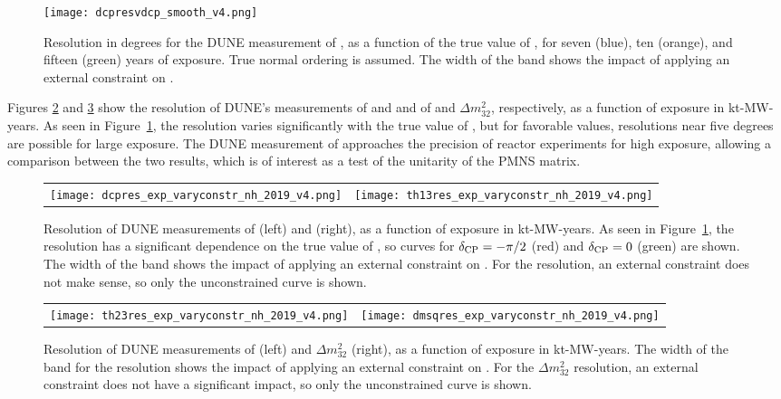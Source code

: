 \begin{figure}[h!]
    \centering
		\texttt{[image: dcpresvdcp\_smooth\_v4.png]}
	\caption[Resolution for the DUNE measurement of \deltacp as a function of \deltacp]
	{Resolution in degrees for the DUNE measurement of \deltacp, as a function of the true value of \deltacp, for seven (blue), ten (orange), and fifteen (green) years of exposure. True normal ordering is assumed. The width of the band shows the impact of applying an external constraint on .}
    \label{fig:dcpresvdcp}
\end{figure}

Figures \ref{fig:appres_exp} and  \ref{fig:disres_exp} show the resolution of DUNE's measurements of \deltacp and  and of  and $\Delta m^{2}_{32}$, respectively, as a function of exposure in kt-MW-years. As seen in Figure~\ref{fig:dcpresvdcp}, the \deltacp resolution varies significantly with the true value of \deltacp, but for favorable values, resolutions near five degrees are possible for large exposure. The DUNE measurement of  approaches the precision of reactor experiments for high exposure, allowing a comparison between the two results, which is of interest as a test of the unitarity of the PMNS matrix. 

\begin{figure}[h!]
    \centering
    \begin{tabular}{cc}
		\texttt{[image: dcpres\_exp\_varyconstr\_nh\_2019\_v4.png]} &
		\texttt{[image: th13res\_exp\_varyconstr\_nh\_2019\_v4.png]} 
	\end{tabular}  
	\caption[Resolution of DUNE measurements of \deltacp and , as a function of exposure]{Resolution of DUNE measurements of \deltacp (left) and  (right), as a function of exposure in kt-MW-years. As seen in Figure~\ref{fig:dcpresvdcp}, the \deltacp resolution has a significant dependence on the true value of \deltacp, so curves for $\delta_{\rm CP}=-\pi/2$ (red) and $\delta_{\rm CP}=0$ (green) are shown. The width of the band shows the impact of applying an external constraint on . For the  resolution, an external constraint does not make sense, so only the unconstrained curve is shown.}
    \label{fig:appres_exp}
\end{figure}

\begin{figure}[h!]
    \centering
    \begin{tabular}{cc}
		\texttt{[image: th23res\_exp\_varyconstr\_nh\_2019\_v4.png]} &
		\texttt{[image: dmsqres\_exp\_varyconstr\_nh\_2019\_v4.png]} 
	\end{tabular}  
	\caption[Resolution of DUNE measurements of \deltacp and , as a function of exposure]{Resolution of DUNE measurements of  (left) and $\Delta m^{2}_{32}$ (right), as a function of exposure in kt-MW-years. The width of the band for the  resolution shows the impact of applying an external constraint on . For the $\Delta m^{2}_{32}$ resolution, an external constraint does not have a significant impact, so only the unconstrained curve is shown.}
    \label{fig:disres_exp}
\end{figure}

